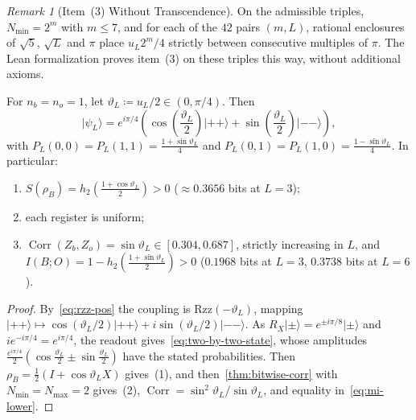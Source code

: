 \documentclass[11pt,a4paper]{article}
\theoremstyle{plain}
\theoremstyle{definition}
\theoremstyle{remark}
\newtheorem*{remark*}{Remark}
\newcommand{\Corr}{\operatorname{Corr}}
\newcommand{\ket}[1]{\lvert#1\rangle}
\begin{document}
\begin{remark*}[Item~(3) Without Transcendence]
  On the admissible triples, \( N_{\min} = 2^m \) with \( m \le 7 \), and for each of the
  \( 42 \) pairs \( (m, L) \), rational enclosures of \( \sqrt{5} \), \( \sqrt{L} \) and \( \pi \)
  place \( u_L 2^m / 4 \) strictly between consecutive multiples of \( \pi \). The Lean
  formalization proves item~(3) on these triples this way, without additional axioms.
\end{remark*}

\begin{corollary}\label{cor:two-by-two}
  For \( n_b = n_o = 1 \), let \( \vartheta_L \coloneqq u_L / 2 \in (0, \pi / 4) \). Then
  \begin{equation}\label{eq:two-by-two-state}
    \ket{\psi_L} = e^{i\pi / 4}
    \left(\cos\left(\frac{\vartheta_L}{2}\right)\ket{++} +
    \sin\left(\frac{\vartheta_L}{2}\right)\ket{--}\right),
  \end{equation}
  with \( P_L(0, 0) = P_L(1, 1) = \frac{1 + \sin\vartheta_L}{4} \) and
  \( P_L(0, 1) = P_L(1, 0) = \frac{1 - \sin\vartheta_L}{4} \). In particular:
  \begin{enumerate}
    \item \( S(\rho_B) = h_2\left(\frac{1 + \cos\vartheta_L}{2}\right) > 0 \)
      (\( \approx 0.3656 \) bits at \( L = 3 \));
    \item each register is uniform;
    \item \( \Corr(Z_b, Z_o) = \sin\vartheta_L \in [0.304, 0.687] \), strictly increasing in
      \( L \), and \( I(B; O) = 1 - h_2\left(\frac{1 + \sin\vartheta_L}{2}\right) > 0 \)
      (\( 0.1968 \) bits at \( L = 3 \), \( 0.3738 \) bits at \( L = 6 \)).
  \end{enumerate}
\end{corollary}
\begin{proof}
  By~\eqref{eq:rzz-pos} the coupling is \( \mathrm{Rzz}(-\vartheta_L) \), mapping
  \( \ket{++} \mapsto \cos(\vartheta_L / 2)\ket{++} + i\sin(\vartheta_L / 2)\ket{--} \). As
  \( R_X\ket{\pm} = e^{\pm i\pi / 8}\ket{\pm} \) and \( i e^{-i\pi / 4} = e^{i\pi / 4} \), the
  readout gives~\eqref{eq:two-by-two-state}, whose amplitudes
  \( \frac{e^{i\pi / 4}}{2}(\cos\frac{\vartheta_L}{2} \pm \sin\frac{\vartheta_L}{2}) \) have the
  stated probabilities. Then \( \rho_B = \frac{1}{2}(I + \cos\vartheta_L X) \) gives~(1), and
  then~\cref{thm:bitwise-corr} with \( N_{\min} = N_{\max} = 2 \) gives~(2),
  \( \Corr = \sin^2\vartheta_L / \sin\vartheta_L \), and equality in~\eqref{eq:mi-lower}.
\end{proof}
\end{document}
